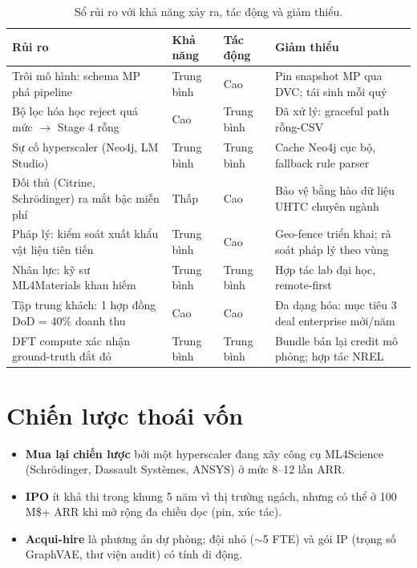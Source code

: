 \documentclass[11pt,a4paper]{report}
\begin{document}
\begin{table}[h]
\centering
\caption{Sổ rủi ro với khả năng xảy ra, tác động và giảm thiểu.}
\label{tab:risk}
\small
\begin{tabular}{p{3.6cm}p{2.4cm}p{1.6cm}p{6.6cm}}
\toprule
\textbf{Rủi ro} & \textbf{Khả năng} & \textbf{Tác động} & \textbf{Giảm thiểu} \\
\midrule
Trôi mô hình: schema MP phá pipeline & Trung bình & Cao & Pin snapshot MP qua DVC; tái sinh mỗi quý \\
Bộ lọc hóa học reject quá mức $\to$ Stage 4 rỗng & Cao & Trung bình & Đã xử lý: graceful path rỗng-CSV \\
Sự cố hyperscaler (Neo4j, LM Studio) & Trung bình & Trung bình & Cache Neo4j cục bộ, fallback rule parser \\
Đối thủ (Citrine, Schrödinger) ra mắt bậc miễn phí & Thấp & Cao & Bảo vệ bằng hào dữ liệu UHTC chuyên ngành \\
Pháp lý: kiểm soát xuất khẩu vật liệu tiên tiến & Trung bình & Cao & Geo-fence triển khai; rà soát pháp lý theo vùng \\
Nhân lực: kỹ sư ML4Materials khan hiếm & Trung bình & Trung bình & Hợp tác lab đại học, remote-first \\
Tập trung khách: 1 hợp đồng DoD = 40\% doanh thu & Cao & Cao & Đa dạng hóa: mục tiêu 3 deal enterprise mới/năm \\
DFT compute xác nhận ground-truth đắt đỏ & Trung bình & Trung bình & Bundle bán lại credit mô phỏng; hợp tác NREL \\
\bottomrule
\end{tabular}
\end{table}

\section{Chiến lược thoái vốn}

\begin{itemize}[leftmargin=*,itemsep=2pt]
\item \textbf{Mua lại chiến lược} bởi một hyperscaler đang xây công cụ ML4Science
      (Schrödinger, Dassault Systèmes, ANSYS) ở mức 8--12 lần ARR.
\item \textbf{IPO} ít khả thi trong khung 5 năm vì thị trường ngách, nhưng có thể ở
      100\,M\$+ ARR khi mở rộng đa chiều dọc (pin, xúc tác).
\item \textbf{Acqui-hire} là phương án dự phòng; đội nhỏ ($\sim$5 FTE) và gói IP (trọng số
      GraphVAE, thư viện audit) có tính di động.
\end{itemize}
\end{document}
